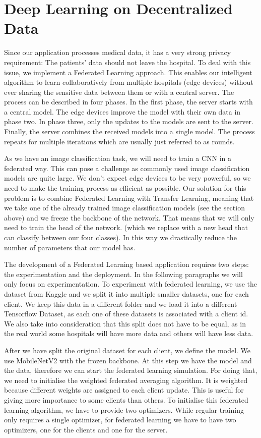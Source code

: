 \documentclass[runningheads,a4paper,11pt]{report}
\begin{document}
\section{Deep Learning on Decentralized Data}
Since our application processes medical data, it has a very strong privacy requirement: The patients’ data should not leave the hospital. To deal with this issue, we implement a Federated Learning approach. This enables our intelligent algorithm to learn collaboratively from multiple hospitals (edge devices) without ever sharing the sensitive data between them or with a central server. The process can be described in four phases. In the first phase, the server starts with a central model. The edge devices improve the model with their own data in phase two. In phase three, only the updates to the models are sent to the server.  Finally, the server combines the received models into a single model. The process repeats for multiple iterations which are usually just referred to as rounds.

As we have an image classification task, we will need to train a CNN in a federated way. This can pose a challenge as commonly used image classification models are quite large. We don’t expect edge devices to be very powerful, so we need to make the training process as efficient as possible. Our solution for this problem is to combine Federated Learning with Transfer Learning, meaning that we take one of the already trained image classification models (see the section above) and we freeze the backbone of the network. That means that we will only need to train the head of the network. (which we replace with a new head that can classify between our four classes). In this way we drastically reduce the number of parameters that our model has.

The development of a Federated Learning based application requires two steps: the experimentation and the deployment. In the following paragraphs we will only focus on experimentation. To experiment with federated learning, we use the dataset from Kaggle and we split it into multiple smaller datasets, one for each client. We keep this data in a different folder and we load it into a different Tensorflow Dataset, as each one of these datasets is associated with a client id. We also take into consideration that this split does not have to be equal, as in the real world some hospitals will have more data and others will have less data.

After we have split the original dataset for each client, we define the model. We use MobileNetV2 with the frozen backbone. At this step we have the model and the data, therefore we can start the federated learning simulation. For doing that, we need to initialise the weighted federated averaging algorithm. It is weighted because different weights are assigned to each client update. This is useful for giving more importance to some clients than others. To initialise this federated learning algorithm, we have to provide two optimizers. While regular training only requires a single optimizer, for federated learning we have to have two optimizers, one for the clients and one for the server.
\end{document}
